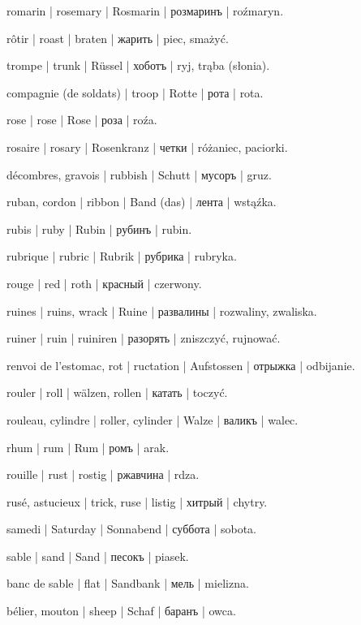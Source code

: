\begin{outdent}{1em}
romarin | rosemary | Rosmarin | розмаринъ | roźmaryn.

rôtir | roast | braten | жарить | piec, smażyć.

trompe | trunk | Rüssel | хоботъ | ryj, trąba (słonia).

compagnie (de soldats) | troop | Rotte | рота | rota.

rose | rose | Rose | роза | roźa.

rosaire | rosary | Rosenkranz | четки | różaniec, paciorki.

décombres, gravois | rubbish | Schutt | мусоръ | gruz.

ruban, cordon | ribbon | Band (das) | лента | wstąźka.

rubis | ruby | Rubin | рубинъ | rubin.

rubrique | rubric | Rubrik | рубрика | rubryka.

rouge | red | roth | красный | czerwony.

ruines | ruins, wrack | Ruine | развалины | rozwaliny, zwaliska.

\uvsubentry{}
ruiner | ruin | ruiniren | разорять | zniszczyć, rujnować.

renvoi de l’estomac, rot | ructation | Aufstossen | отрыжка | odbijanie.

rouler | roll | wälzen, rollen | катать | toczyć.

\uvsubentry{}
rouleau, cylindre | roller, cylinder | Walze | валикъ | walec.

rhum | rum | Rum | ромъ | arak.

rouille | rust | rostig | ржавчина | rdza.

rusé, astucieux | trick, ruse | listig | хитрый | chytry.


samedi | Saturday | Sonnabend | суббота | sobota.

sable | sand | Sand | песокъ | piasek.

\uvsubentry{}
banc de sable | flat | Sandbank | мель | mielizna.

bélier, mouton | sheep | Schaf | баранъ | owca.


\end{outdent}
